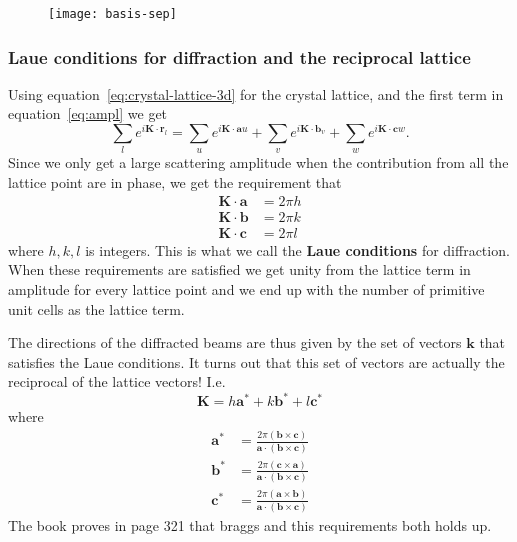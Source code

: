 \documentclass[11pt]{article}
\begin{document}
\begin{figure}[!h]
	\centering
	\texttt{[image: basis-sep]}
	\caption{}
	\label{fig:basis-sep}
\end{figure}

\newpage
\subsubsection{Laue conditions for diffraction and the reciprocal lattice}
Using equation~\ref{eq:crystal-lattice-3d} for the crystal lattice, and the first term in equation~\ref{eq:ampl} we get
\begin{equation}
	\sum_l e^{i\mathbf{K} \cdot \mathbf{r}_l} =\sum_u e^{i\mathbf{K} \cdot \mathbf{a}u} + \sum_v e^{i\mathbf{K} \cdot \mathbf{b}_v} + \sum_w e^{i\mathbf{K} \cdot \mathbf{c}w}.
\end{equation}
Since we only get a large scattering amplitude when the contribution from all the lattice point are in phase, we get the requirement that
\begin{align}
	\mathbf{K} \cdot \mathbf{a} &= 2\pi h \\
	\mathbf{K} \cdot \mathbf{b} &= 2\pi k \\
	\mathbf{K} \cdot \mathbf{c} &= 2\pi l 
\end{align}
where $h,k,l$ is integers. This is what we call the \textbf{Laue conditions} for diffraction. When these requirements are satisfied we get unity from the lattice term in amplitude for every lattice point and we end up with the number of primitive unit cells as the lattice term.

The directions of the diffracted beams are thus given by the set of vectors $\mathbf{k}$ that satisfies the Laue conditions. It turns out that this set of vectors are actually the reciprocal of the lattice vectors! I.e.
\begin{equation}
	\mathbf{K} = h\mathbf{a^*} + k\mathbf{b^*} + l \mathbf{c^*}
\end{equation}
where 
\begin{align}
	\mathbf{a^*} &= \frac{2\pi(\mathbf{b}\times\mathbf{c})}{\mathbf{a}\cdot(\mathbf{b}\times\mathbf{c})} \nonumber\\
	\mathbf{b^*} &= \frac{2\pi(\mathbf{c}\times\mathbf{a})}{\mathbf{a}\cdot(\mathbf{b}\times\mathbf{c})} \nonumber\\
	\mathbf{c^*} &= \frac{2\pi(\mathbf{a}\times\mathbf{b})}{\mathbf{a}\cdot(\mathbf{b}\times\mathbf{c})} 
	\label{eq:reciprocal-lattice}
\end{align}
The book proves in page 321 that braggs and this requirements both holds up.
\end{document}
